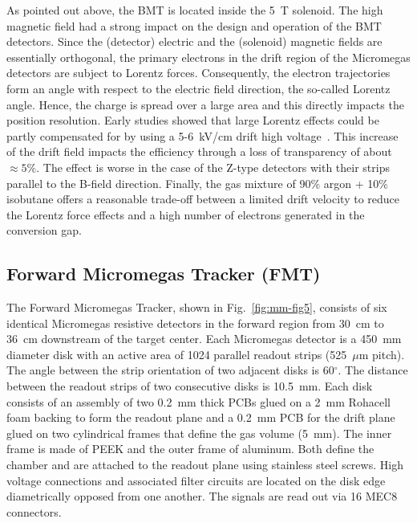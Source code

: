 As pointed out above, the BMT is located inside the 5~T solenoid. The high magnetic field had a strong impact on the design and
operation of the BMT detectors. Since the (detector) electric and the (solenoid) magnetic fields are essentially orthogonal, the
primary electrons in the drift region of the Micromegas detectors are subject to Lorentz forces. Consequently, the electron
trajectories form an angle with respect to the electric field direction, the so-called Lorentz angle. Hence, the charge is spread
over a large area and this directly impacts the position resolution. Early studies showed that large Lorentz effects could be
partly compensated for by using a 5-6~kV/cm drift high voltage~\cite{KONCZYKOWSKI2010274}. This increase of the drift
field impacts the efficiency through a loss of transparency of about \(\approx5\%\). The effect is worse in the case of the
Z-type detectors with their strips parallel to the B-field direction. Finally, the gas mixture of 90\% argon + 10\% isobutane
offers a reasonable trade-off between a limited drift velocity to reduce the Lorentz force effects and a high number of
electrons generated in the conversion gap. 

\subsection{Forward Micromegas Tracker (FMT)}

The Forward Micromegas Tracker, shown in Fig.~\ref{fig:mm-fig5}, consists of six identical Micromegas resistive detectors in
the forward region from 30~cm to 36~cm downstream of the target center. Each Micromegas detector is a 450~mm diameter disk with an
active area of 1024 parallel readout strips (525~$\mu$m pitch). The angle between the strip orientation of two adjacent disks
is 60$^\circ$. The distance between the readout strips of two consecutive disks is 10.5~mm.  Each disk consists of an assembly
of two 0.2~mm thick PCBs glued on a 2~mm Rohacell foam backing to form the readout plane and a 0.2~mm PCB for the drift plane
glued on two cylindrical frames that define the gas volume (5~mm). The inner frame is made of PEEK and the outer frame of
aluminum. Both define the chamber and are attached to the readout plane using stainless steel screws. High voltage connections
and associated filter circuits are located on the disk edge diametrically opposed from one another. The signals are read out via
16 MEC8 connectors.

